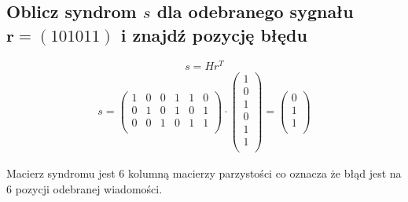 \documentclass[12pt]{article}
\begin{document}
    \subsection*{Oblicz syndrom $s$ dla odebranego sygnału $\mathbf{r} = (101011)$ i znajdź pozycję błędu} 
    $$ s = Hr^T $$
    \begin{align*}
        s=  \begin{pmatrix}
            1 & 0 & 0  & 1 & 1 & 0 \\ 
            0 & 1 & 0  & 1 & 0 & 1 \\ 
            0 & 0 & 1  & 0 & 1 & 1 \\ 
        \end{pmatrix} 
        \cdot
        \begin{pmatrix}
           1 \\ 
           0 \\ 
           1 \\ 
           0 \\ 
           1 \\ 
           1 \\ 
        \end{pmatrix} = 
        \begin{pmatrix}
            0 \\ 
            1 \\ 
            1 \\ 
        \end{pmatrix}
    \end{align*}

    Macierz syndromu jest 6 kolumną macierzy parzystości co oznacza że błąd jest na 6 pozycji odebranej wiadomości.








    
\end{document}
